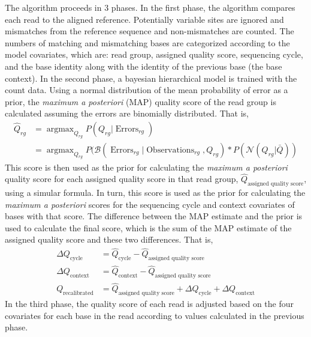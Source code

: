 The algorithm proceeds in 3 phases.
In the first phase, the algorithm compares each read to the aligned reference. Potentially variable sites are ignored and mismatches from the reference sequence and non-mismatches are counted. The numbers of matching and mismatching bases are categorized according to the model covariates, which are: read group, assigned quality score, sequencing cycle, and the base identity along with the identity of the previous base (the base context).
In the second phase, a bayesian hierarchical model is trained with the count data. Using a normal distribution of the mean probability of error as a prior, the \textit{maximum a posteriori} (MAP) quality score of the read group is calculated assuming the errors are binomially distributed. That is,
\begin{align}
\hat{Q}_{rg} &= \operatorname{argmax}_{Q_{rg}} P(Q_{rg}|\operatorname{Errors}_{rg}) \\
&= \operatorname{argmax}_{Q_{rg}} P(\mathcal{B}(\operatorname{Errors}_{rg} | \operatorname{Observations}_{rg}, Q_{rg}) * P(\mathcal{N}(Q_{rg} | \bar{Q}))
\end{align}
This score is then used as the prior for calculating the \textit{maximum a posteriori} quality score for each assigned quality score in that read group, $\hat{Q}_{\operatorname{assigned\:quality\:score}}$, using a simular formula.
In turn, this score is used as the prior for calculating the \textit{maximum a posteriori} scores for the sequencing cycle and context covariates of bases with that score. The difference between the MAP estimate and the prior is used to calculate the final score, which is the sum of the MAP estimate of the assigned quality score and these two differences. That is,
\begin{align}
\Delta Q_{\operatorname{cycle}} &= \hat{Q}_{\operatorname{cycle}} - \hat{Q}_{\operatorname{assigned\:quality\:score}} \\
\Delta Q_{\operatorname{context}} &= \hat{Q}_{\operatorname{context}} - \hat{Q}_{\operatorname{assigned\:quality\:score}} \\
Q_{\operatorname{recalibrated}} &= \hat{Q}_{\operatorname{assigned\:quality\:score}} + \Delta Q_{\operatorname{cycle}} + \Delta Q_{\operatorname{context}}
\end{align}
In the third phase, the quality score of each read is adjusted based on the four covariates for each base in the read according to values calculated in the previous phase.

